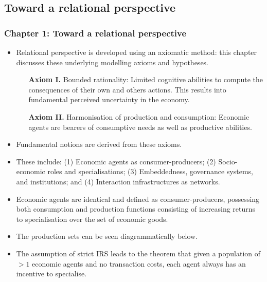 \documentclass[10pt]{beamer}
\begin{document}
\subsection{Toward a relational perspective}

\begin{frame} \frametitle{Chapter 1: Toward a relational perspective}
\begin{itemize}
\item Relational perspective is developed using an axiomatic method: this chapter discusses these underlying modelling axioms and hypotheses.
\begin{itemize}
\medskip
\item[\textbf{Axiom I.}] Bounded rationality: Limited cognitive abilities to compute the consequences of their own and others actions. This
results into fundamental perceived uncertainty in the economy.
\medskip
\item[\textbf{Axiom II.}] Harmonisation of production and consumption: Economic agents are bearers of consumptive needs as well as productive abilities.
\end{itemize}
\medskip
\item Fundamental notions are derived from these axioms.
\medskip
\item These include: (1) Economic agents as consumer-producers; (2) Socio-economic roles and specialisations; (3) Embeddedness, governance systems, and institutions; and (4) Interaction infrastructures as networks.
\end{itemize}
\end{frame}


\begin{frame} %
\begin{itemize}
\item Economic agents are identical and defined as consumer-producers, possessing both consumption and production functions consisting of increasing returns to specialisation over the set of economic goods.
\medskip
\item The production sets can be seen diagrammatically below.
\medskip
\item The assumption of strict IRS leads to the theorem that given a population of $> 1$ economic agents and no transaction costs, each agent always has an incentive to specialise.
\end{itemize}
\end{frame}
\end{document}
